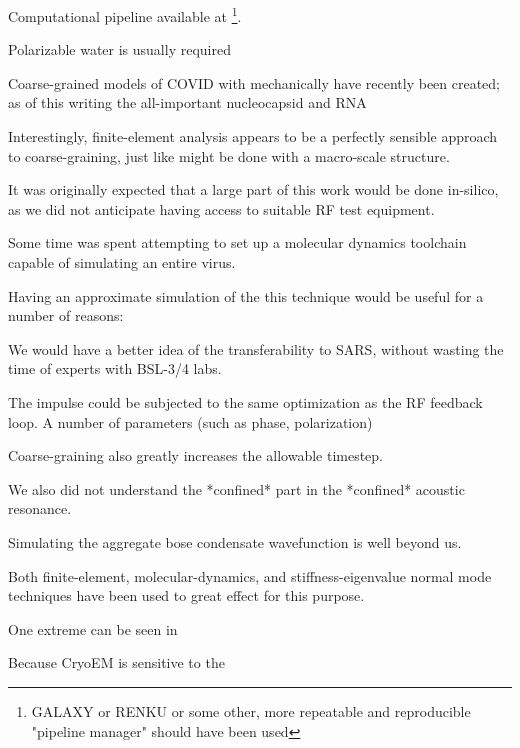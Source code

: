 \documentclass[paper.tex]{subfiles}
\begin{document}
Computational pipeline available at  \footnote{GALAXY or RENKU or some other, more repeatable and reproducible "pipeline manager" should have been used}. 

Polarizable water is usually required

Coarse-grained models of COVID with mechanically have recently been created; as of this writing the all-important nucleocapsid and RNA 



Interestingly, finite-element analysis appears to be a perfectly sensible approach to coarse-graining, just like might be done with a macro-scale structure.





It was originally expected that a large part of this work would be done in-silico, as we did not anticipate having access to suitable RF test equipment. 

Some time was spent attempting to set up a molecular dynamics toolchain capable of simulating an entire virus. 

Having an approximate simulation of the this technique would be useful for a number of reasons: 

We would have a better idea of the transferability to SARS, without wasting the time of experts with BSL-3/4 labs.

The impulse could be subjected to the same optimization as the RF feedback loop. A number of parameters (such as phase, polarization)



Coarse-graining also greatly increases the allowable timestep.

We also did not understand the *confined* part in the *confined* acoustic resonance.

Simulating the aggregate bose condensate wavefunction is well beyond us.


Both finite-element, molecular-dynamics, and stiffness-eigenvalue normal mode techniques have been used to great effect for this purpose. 








One extreme can be seen in 

Because CryoEM is sensitive to the 
\end{document}
